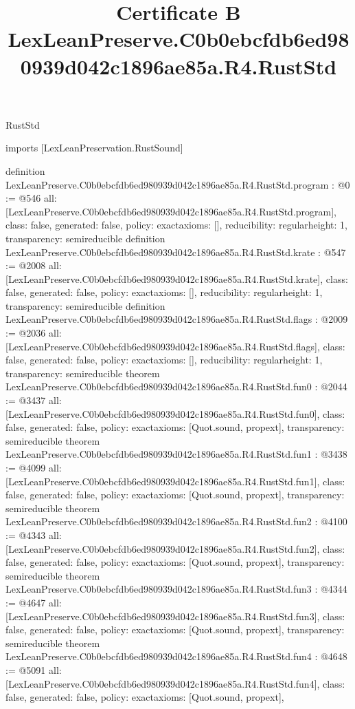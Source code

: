 \begin{lexlean}{RustStd}
\title{Certificate B LexLeanPreserve.C0b0ebcfdb6ed980939d042c1896ae85a.R4.RustStd}
\begin{coremodule}
imports [LexLeanPreservation.RustSound]

definition LexLeanPreserve.C0b0ebcfdb6ed980939d042c1896ae85a.R4.RustStd.program : @0 := @546 {
  all: [LexLeanPreserve.C0b0ebcfdb6ed980939d042c1896ae85a.R4.RustStd.program],
  class: false,
  generated: false,
  policy: exact{axioms: []},
  reducibility: regular{height: 1},
  transparency: semireducible
}
definition LexLeanPreserve.C0b0ebcfdb6ed980939d042c1896ae85a.R4.RustStd.krate : @547 := @2008 {
  all: [LexLeanPreserve.C0b0ebcfdb6ed980939d042c1896ae85a.R4.RustStd.krate],
  class: false,
  generated: false,
  policy: exact{axioms: []},
  reducibility: regular{height: 1},
  transparency: semireducible
}
definition LexLeanPreserve.C0b0ebcfdb6ed980939d042c1896ae85a.R4.RustStd.flags : @2009 := @2036 {
  all: [LexLeanPreserve.C0b0ebcfdb6ed980939d042c1896ae85a.R4.RustStd.flags],
  class: false,
  generated: false,
  policy: exact{axioms: []},
  reducibility: regular{height: 1},
  transparency: semireducible
}
theorem LexLeanPreserve.C0b0ebcfdb6ed980939d042c1896ae85a.R4.RustStd.fun0 : @2044 := @3437 {
  all: [LexLeanPreserve.C0b0ebcfdb6ed980939d042c1896ae85a.R4.RustStd.fun0],
  class: false,
  generated: false,
  policy: exact{axioms: [Quot.sound, propext]},
  transparency: semireducible
}
theorem LexLeanPreserve.C0b0ebcfdb6ed980939d042c1896ae85a.R4.RustStd.fun1 : @3438 := @4099 {
  all: [LexLeanPreserve.C0b0ebcfdb6ed980939d042c1896ae85a.R4.RustStd.fun1],
  class: false,
  generated: false,
  policy: exact{axioms: [Quot.sound, propext]},
  transparency: semireducible
}
theorem LexLeanPreserve.C0b0ebcfdb6ed980939d042c1896ae85a.R4.RustStd.fun2 : @4100 := @4343 {
  all: [LexLeanPreserve.C0b0ebcfdb6ed980939d042c1896ae85a.R4.RustStd.fun2],
  class: false,
  generated: false,
  policy: exact{axioms: [Quot.sound, propext]},
  transparency: semireducible
}
theorem LexLeanPreserve.C0b0ebcfdb6ed980939d042c1896ae85a.R4.RustStd.fun3 : @4344 := @4647 {
  all: [LexLeanPreserve.C0b0ebcfdb6ed980939d042c1896ae85a.R4.RustStd.fun3],
  class: false,
  generated: false,
  policy: exact{axioms: [Quot.sound, propext]},
  transparency: semireducible
}
theorem LexLeanPreserve.C0b0ebcfdb6ed980939d042c1896ae85a.R4.RustStd.fun4 : @4648 := @5091 {
  all: [LexLeanPreserve.C0b0ebcfdb6ed980939d042c1896ae85a.R4.RustStd.fun4],
  class: false,
  generated: false,
  policy: exact{axioms: [Quot.sound, propext]},
}
\end{coremodule}
\end{lexlean}
